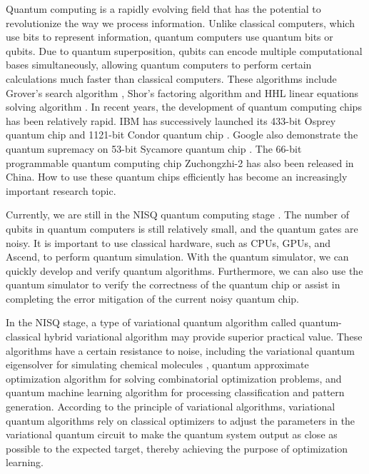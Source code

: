 Quantum computing is a rapidly evolving field that has the potential to revolutionize the way we process information. Unlike classical computers, which use bits to represent information, quantum computers use quantum bits or qubits. Due to quantum superposition, qubits can encode multiple computational bases simultaneously, allowing quantum computers to perform certain calculations much faster than classical computers. These algorithms include Grover's search algorithm \cite{grover1996fast, long2001grover}, Shor's factoring algorithm \cite{shor1994algorithms} and HHL linear equations solving algorithm \cite{harrow2009quantum}. In recent years, the development of quantum computing chips has been relatively rapid. IBM has successively launched its 433-bit Osprey quantum chip \cite{ibm2022osprey} and 1121-bit Condor quantum chip \cite{castelvecchi2023ibm}. Google also demonstrate the quantum supremacy on 53-bit Sycamore quantum chip \cite{arute2019quantum}. The 66-bit programmable quantum computing chip Zuchongzhi-2 \cite{wu2021strong} has also been released in China. How to use these quantum chips efficiently has become an increasingly important research topic.

Currently, we are still in the NISQ quantum computing stage \cite{preskill2018quantum}. The number of qubits in quantum computers is still relatively small, and the quantum gates are noisy. It is important to use classical hardware, such as CPUs, GPUs, and Ascend, to perform quantum simulation. With the quantum simulator, we can quickly develop and verify quantum algorithms. Furthermore, we can also use the quantum simulator to verify the correctness of the quantum chip or assist in completing the error mitigation of the current noisy quantum chip.

In the NISQ stage, a type of variational quantum algorithm \cite{Peruzzo2014Peruzzo2014,cerezo2021variational} called quantum-classical hybrid variational algorithm may provide superior practical value. These algorithms have a certain resistance to noise, including the variational quantum eigensolver for simulating chemical molecules \cite{mcardle2020quantum,cao2019quantum,yeter2020practical,fan2023circuit}, quantum approximate optimization algorithm \cite{farhi2014quantum,PhysRevResearch.4.013141} for solving combinatorial optimization problems, and quantum machine learning algorithm \cite{benedetti2019parameterized,biamonte2017quantum,das2019machine} for processing classification and pattern generation. According to the principle of variational algorithms, variational quantum algorithms rely on classical optimizers to adjust the parameters in the variational quantum circuit to make the quantum system output as close as possible to the expected target, thereby achieving the purpose of optimization learning.

